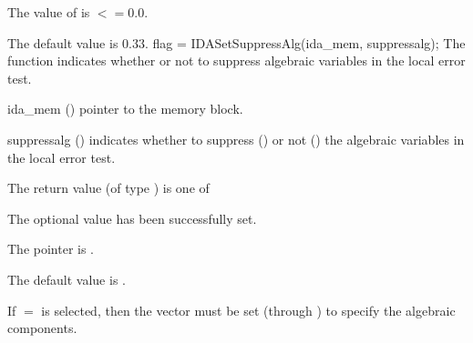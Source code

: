 {{\begin{args}
  \item[\Id{IDA\_ILL\_INPUT}]
    The value of  is $<= 0.0$.
  \end{args}
}
{
  The default value is $0.33$.
}
{
flag = IDASetSuppressAlg(ida\_mem, suppressalg);
}
{
  The function  indicates whether or not to
  suppress algebraic variables in the local error test.
}
{
  \begin{args}[suppressalg]
  \item[ida\_mem] ()
    pointer to the {\idas} memory block.
  \item[suppressalg] ()
    indicates whether to suppress () or not
    () the algebraic variables in the local error test.
  \end{args}
}
{
  The return value  (of type ) is one of
  \begin{args}
  \item[\Id{IDA\_SUCCESS}] 
    The optional value has been successfully set.
  \item[\Id{IDA\_MEM\_NULL}]
    The  pointer is .
  \end{args}
}
{
  The default value is .

  If $=$ is selected, then the  vector
  must be set (through ) to specify the algebraic components.

}}
